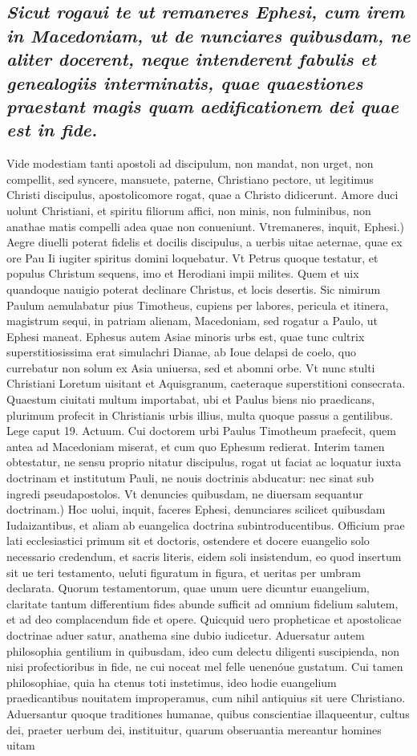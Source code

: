 \documentclass{article}
\begin{document}
\begin{pages}
\subsection*{\textit{Sicut rogaui te ut remaneres Ephesi, cum irem in Macedoniam, ut de nunciares quibusdam, ne aliter docerent, neque intenderent fabulis et genealogiis interminatis, quae quaestiones praestant magis quam aedificationem dei quae est in fide. }}\pstart Vide modestiam tanti apostoli ad discipulum, non mandat, non urget, non compellit, sed syncere, mansuete, paterne, Christiano pectore, ut legitimus Christi discipulus, apostolicomore rogat, quae a Christo didicerunt. Amore duci uolunt Christiani, et spiritu filiorum affici, non minis, non fulminibus, non anathae matis compelli adea quae non conueniunt. Vtremaneres, inquit, Ephesi.) Aegre diuelli poterat fidelis et docilis discipulus, a uerbis uitae aeternae, quae ex ore Pau Ii iugiter spiritus domini loquebatur. Vt Petrus quoque testatur, et populus Christum sequens, imo et Herodiani impii milites. Quem et uix quandoque nauigio poterat declinare Christus, et locis desertis. Sic nimirum Paulum aemulabatur pius Timotheus, cupiens per labores, pericula et itinera, magistrum sequi, in patriam alienam, Macedoniam, sed rogatur a Paulo, ut Ephesi maneat. Ephesus autem Asiae minoris urbs est, quae tunc cultrix superstitiosissima erat simulachri Dianae, ab Ioue delapsi de coelo, quo currebatur non solum ex Asia uniuersa, sed et abomni orbe. Vt nunc stulti Christiani Loretum uisitant et Aquisgranum, caeteraque superstitioni consecrata. Quaestum ciuitati multum importabat, ubi et Paulus biens nio praedicans, plurimum profecit in Christianis urbis illius, multa quoque passus a gentilibus. Lege caput 19. Actuum. Cui doctorem urbi Paulus Timotheum praefecit, quem antea ad Macedoniam miserat, et cum quo Ephesum redierat. Interim tamen obtestatur, ne sensu proprio nitatur discipulus, rogat ut faciat ac loquatur iuxta doctrinam et institutum Pauli, ne nouis doctrinis abducatur: nec sinat sub ingredi pseudapostolos. Vt denuncies quibusdam, ne diuersam sequantur doctrinam.) Hoc uolui, inquit, faceres Ephesi, denunciares scilicet quibusdam Iudaizantibus, et aliam ab euangelica doctrina subintroducentibus. Officium prae lati ecclesiastici primum sit et doctoris, ostendere et docere euangelio solo necessario credendum, et sacris literis, eidem soli insistendum, eo quod insertum sit ue teri testamento, ueluti figuratum in figura, et ueritas per umbram declarata. Quorum testamentorum, quae unum uere dicuntur euangelium, claritate tantum differentium fides abunde sufficit ad omnium fidelium salutem, et ad deo complacendum fide et opere. Quicquid uero propheticae et apostolicae doctrinae aduer satur, anathema sine dubio iudicetur. Aduersatur autem philosophia gentilium in quibusdam, ideo cum delectu diligenti suscipienda, non nisi profectioribus in fide, ne cui noceat mel felle uenenóue gustatum. Cui tamen philosophiae, quia ha ctenus toti instetimus, ideo hodie euangelium praedicantibus nouitatem improperamus, cum nihil antiquius sit uere Christiano. Aduersantur quoque traditiones humanae, quibus conscientiae illaqueentur, cultus dei, praeter uerbum dei, instituitur, quarum obseruantia mereantur homines uitam 
\end{pages}
\end{document}
